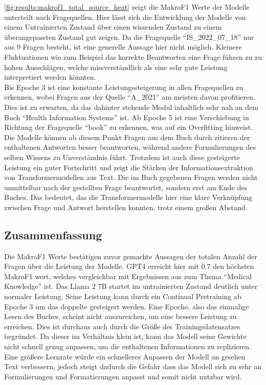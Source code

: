 
\cref{fig:results:makrof1_total_source_heat} zeigt die MakroF1 Werte der Modelle unterteilt nach Fragequellen.
Hier lässt sich die Entwicklung der Modelle von einem Untrainierten Zustand über einen wissenden Zustand zu einem überangepassten Zustand gut zeigen.
Da die Fragequelle \enquote{IS\_2022\_07\_18} nur aus \num{9} Fragen besteht, ist eine generelle Aussage hier nicht möglich.
Kleinere Fluktuationen wie zum Beispiel das korrekte Beantworten eine Frage führen zu zu hohen Ausschlägen, welche missverständlich als eine sehr gute Leistung interpretiert werden könnten.\\

Bis Epoche 3 ist eine konstante Leistungssteigerung in allen Fragequellen zu erkennen, wobei Fragen aus der Quelle \enquote{A\_2021} am meisten davon profitieren.
Dies ist zu erwarten, da das dahinter stehende Modul inhaltlich sehr nah an dem Buch \enquote{Health Information Systems} ist.
Ab Epoche 5 ist eine Verschiebung in Richtung der Fragequelle \enquote{book} zu erkennen, was auf ein Overfitting hinweist.
Die Modelle können ab diesem Punkt Fragen aus dem Buch durch zitieren der enthaltenen Antworten besser beantworten, während andere Formulierungen des selben Wissens zu Unverständnis führt.
Trotzdem ist auch diese gesteigerte Leistung ein guter Fortschritt und zeigt die Stärken der Informationsextraktion von Transformermodellen aus Text.
Die im Buch gegebenen Fragen werden nicht unmittelbar nach der gestellten Frage beantwortet, sondern erst am Ende des Buches.
Das bedeutet, das die Transformermodelle hier eine klare Verknüpfung zwischen Frage und Antwort herstellen konnten, trotz einem großen Abstand.\\

\subsection{Zusammenfassung}
Die MakroF1 Werte bestätigen zuvor gemachte Aussagen der totalen Anzahl der Fragen über die Leistung der Modelle.
GPT4 erreicht hier mit \num{0.7} den höchsten MakroF1 wert, welches vergleichbar mit Ergebnissen aus \citet{gpt4} zum Thema \enquote{Medical Knowledge} ist.
Das Llama 2 7B startet im untrainierten Zustand deutlich unter normaler Leistung.
Seine Leistung kann durch ein Continual Pretraining ab Epoche 3 um das doppelte gesteigert werden.
Eine Epoche, also das einmalige Lesen des Buches, scheint nicht auszureichen, um eine bessere Leistung zu erreichen.
Dies ist durchaus auch durch die Größe des Trainingsdatensatzes begründet.
Da dieser im Verhältnis klein ist, kann das Modell seine Gewichte nicht schnell genug anpassen, um die enthaltenen Informationen zu replizieren.
Eine größere Lernrate würde ein schnelleres Anpassen der Modell an gesehen Text verbessern, jedoch steigt dadurch die Gefahr
dass das Modell sich zu sehr an Formulierungen und Formatierungen anpasst und somit nicht nutzbar wird.\\


